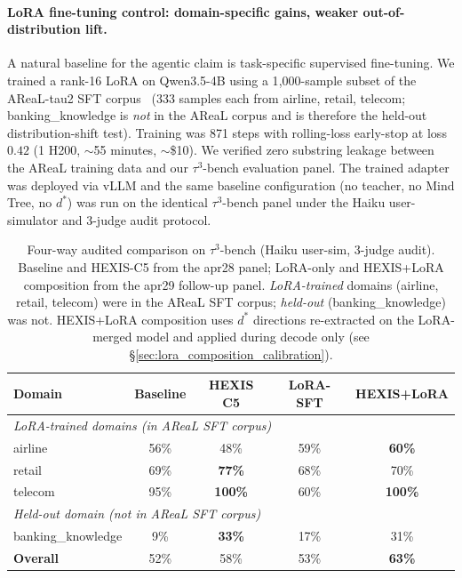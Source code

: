 \paragraph{LoRA fine-tuning control: domain-specific gains, weaker out-of-distribution lift.} A natural baseline for the agentic claim is task-specific supervised fine-tuning. We trained a rank-16 LoRA on Qwen3.5-4B using a 1{,}000-sample subset of the AReaL-tau2 SFT corpus~\citep{gao2025sea, fu2025areal} (333 samples each from airline, retail, telecom; banking\_knowledge is \emph{not} in the AReaL corpus and is therefore the held-out distribution-shift test). Training was 871 steps with rolling-loss early-stop at loss $0.42$ (1 H200, $\sim$55 minutes, $\sim$\$10). We verified zero substring leakage between the AReaL training data and our $\tau^3$-bench evaluation panel. The trained adapter was deployed via vLLM and the same baseline configuration (no teacher, no Mind Tree, no $d^*$) was run on the identical $\tau^3$-bench panel under the Haiku user-simulator and 3-judge audit protocol.

\begin{table}[!ht]
\centering
\small
\caption{Four-way audited comparison on $\tau^3$-bench (Haiku user-sim, 3-judge audit). Baseline and HEXIS-C5 from the apr28 panel; LoRA-only and HEXIS+LoRA composition from the apr29 follow-up panel. \emph{LoRA-trained} domains (airline, retail, telecom) were in the AReaL SFT corpus; \emph{held-out} (banking\_knowledge) was not. HEXIS+LoRA composition uses $d^*$ directions re-extracted on the LoRA-merged model and applied during decode only (see \S\ref{sec:lora_composition_calibration}).}
\label{tab:tau3_lora_comparison}
\begin{tabular}{lcccc}
\toprule
\textbf{Domain} & \textbf{Baseline} & \textbf{HEXIS C5} & \textbf{LoRA-SFT} & \textbf{HEXIS+LoRA} \\
\midrule
\multicolumn{5}{l}{\emph{LoRA-trained domains (in AReaL SFT corpus)}} \\
airline    & 56\% & 48\% & 59\% & \textbf{60\%} \\
retail     & 69\% & \textbf{77\%} & 68\% & 70\% \\
telecom    & 95\% & \textbf{100\%} & 60\% & \textbf{100\%} \\
\midrule
\multicolumn{5}{l}{\emph{Held-out domain (not in AReaL SFT corpus)}} \\
banking\_knowledge & 9\% & \textbf{33\%} & 17\% & 31\% \\
\midrule
\textbf{Overall} & 52\% & 58\% & 53\% & \textbf{63\%} \\
\bottomrule
\end{tabular}
\end{table}

